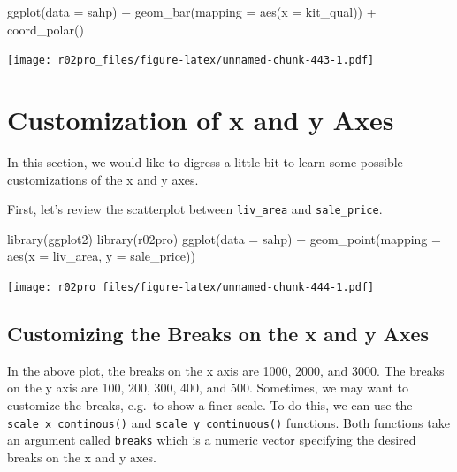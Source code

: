 \documentclass[
]{book}
\newenvironment{Shaded}{\begin{snugshade}}{\end{snugshade}}
\newcommand{\AttributeTok}[1]{\textcolor[rgb]{0.77,0.63,0.00}{#1}}
\newcommand{\FunctionTok}[1]{\textcolor[rgb]{0.00,0.00,0.00}{#1}}
\newcommand{\NormalTok}[1]{#1}
\newcommand{\SpecialCharTok}[1]{\textcolor[rgb]{0.00,0.00,0.00}{#1}}
\begin{document}
\begin{Shaded}
\begin{Highlighting}[]
\FunctionTok{ggplot}\NormalTok{(}\AttributeTok{data =}\NormalTok{ sahp) }\SpecialCharTok{+} \FunctionTok{geom\_bar}\NormalTok{(}\AttributeTok{mapping =} \FunctionTok{aes}\NormalTok{(}\AttributeTok{x =}\NormalTok{ kit\_qual)) }\SpecialCharTok{+} \FunctionTok{coord\_polar}\NormalTok{()}
\end{Highlighting}
\end{Shaded}

\texttt{[image: r02pro\_files/figure-latex/unnamed-chunk-443-1.pdf]}

\hypertarget{customization-axes}{%
\section{Customization of x and y Axes}\label{customization-axes}}

In this section, we would like to digress a little bit to learn some possible customizations of the x and y axes.

First, let's review the scatterplot between \texttt{liv\_area} and \texttt{sale\_price}.

\begin{Shaded}
\begin{Highlighting}[]
\FunctionTok{library}\NormalTok{(ggplot2)}
\FunctionTok{library}\NormalTok{(r02pro)}
\FunctionTok{ggplot}\NormalTok{(}\AttributeTok{data =}\NormalTok{ sahp) }\SpecialCharTok{+} \FunctionTok{geom\_point}\NormalTok{(}\AttributeTok{mapping =} \FunctionTok{aes}\NormalTok{(}\AttributeTok{x =}\NormalTok{ liv\_area, }\AttributeTok{y =}\NormalTok{ sale\_price))}
\end{Highlighting}
\end{Shaded}

\texttt{[image: r02pro\_files/figure-latex/unnamed-chunk-444-1.pdf]}

\hypertarget{customizing-the-breaks-on-the-x-and-y-axes}{%
\subsection{Customizing the Breaks on the x and y Axes}\label{customizing-the-breaks-on-the-x-and-y-axes}}

In the above plot, the breaks on the x axis are 1000, 2000, and 3000. The breaks on the y axis are 100, 200, 300, 400, and 500. Sometimes, we may want to customize the breaks, e.g.~to show a finer scale. To do this, we can use the \texttt{scale\_x\_continous()} and \texttt{scale\_y\_continuous()} functions. Both functions take an argument called \texttt{breaks} which is a numeric vector specifying the desired breaks on the x and y axes.
\end{document}
